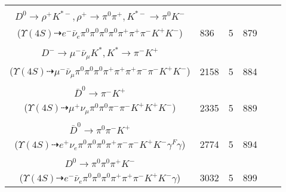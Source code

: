 \documentclass[landscape]{article}
\newcounter{rownumbers}
\newcommand\rn{\stepcounter{rownumbers}\arabic{rownumbers}}
\newcommand{\EOLP}{\\ \hline} %
\newcommand{\topoTags}[1]{#1} %
\begin{document}
\begin{longtable}{clcccc}
\rn & \makecell[l]{ $ 
\Upsilon(4S) \rightarrow B^{+} B^{-} ,
B^{+} \rightarrow \rho^{+} \bar{D}^{0} ,
B^{-} \rightarrow e^{-} \bar{\nu}_{e} D^{*0} ,
\rho^{+} \rightarrow \pi^{0} \pi^{+} ,
\bar{D}^{0} \rightarrow \pi^{-} K^{+} ,
D^{*0} \rightarrow \pi^{0} D^{0} ,
$ \\ $
D^{0} \rightarrow \rho^{+} K^{*-} ,
\rho^{+} \rightarrow \pi^{0} \pi^{+} ,
K^{*-} \rightarrow \pi^{0} K^{-} 
$ \\ ($
\Upsilon(4S) \dashrightarrow e^{-} \bar{\nu}_{e} \pi^{0} \pi^{0} \pi^{0} \pi^{0} \pi^{+} \pi^{+} \pi^{-} K^{+} K^{-} 
$) } & \topoTags{836 & }5 & 879 \EOLP

\rn & \makecell[l]{ $ 
\Upsilon(4S) \rightarrow B^{+} B^{-} ,
B^{+} \rightarrow \pi^{0} \pi^{+} \pi^{+} D^{*-} ,
B^{-} \rightarrow \rho^{-} D^{0} ,
D^{*-} \rightarrow \pi^{0} D^{-} ,
\rho^{-} \rightarrow \pi^{0} \pi^{-} ,
D^{0} \rightarrow \pi^{+} K^{-} ,
$ \\ $
D^{-} \rightarrow \mu^{-} \bar{\nu}_{\mu} K^{*} ,
K^{*} \rightarrow \pi^{-} K^{+} 
$ \\ ($
\Upsilon(4S) \dashrightarrow \mu^{-} \bar{\nu}_{\mu} \pi^{0} \pi^{0} \pi^{0} \pi^{+} \pi^{+} \pi^{+} \pi^{-} \pi^{-} K^{+} K^{-} 
$) } & \topoTags{2158 & }5 & 884 \EOLP

\rn & \makecell[l]{ $ 
\Upsilon(4S) \rightarrow B^{+} B^{-} ,
B^{+} \rightarrow \mu^{+} \nu_{\mu} \bar{D}^{*0} ,
B^{-} \rightarrow \rho^{-} D^{0} ,
\bar{D}^{*0} \rightarrow \pi^{0} \bar{D}^{0} ,
\rho^{-} \rightarrow \pi^{0} \pi^{-} ,
D^{0} \rightarrow K^{+} K^{-} ,
$ \\ $
\bar{D}^{0} \rightarrow \pi^{-} K^{+} 
$ \\ ($
\Upsilon(4S) \dashrightarrow \mu^{+} \nu_{\mu} \pi^{0} \pi^{0} \pi^{-} \pi^{-} K^{+} K^{+} K^{-} 
$) } & \topoTags{2335 & }5 & 889 \EOLP

\rn & \makecell[l]{ $ 
\Upsilon(4S) \rightarrow B^{+} B^{-} ,
B^{+} \rightarrow e^{+} \nu_{e} \bar{D}^{*0} \gamma^{F} ,
B^{-} \rightarrow \rho^{-} D^{0} ,
\bar{D}^{*0} \rightarrow \bar{D}^{0} \gamma ,
\rho^{-} \rightarrow \pi^{0} \pi^{-} ,
D^{0} \rightarrow \pi^{0} \pi^{+} K^{-} ,
$ \\ $
\bar{D}^{0} \rightarrow \pi^{0} \pi^{-} K^{+} 
$ \\ ($
\Upsilon(4S) \dashrightarrow e^{+} \nu_{e} \pi^{0} \pi^{0} \pi^{0} \pi^{+} \pi^{-} \pi^{-} K^{+} K^{-} \gamma^{F} \gamma 
$) } & \topoTags{2774 & }5 & 894 \EOLP

\rn & \makecell[l]{ $ 
\Upsilon(4S) \rightarrow B^{+} B^{-} ,
B^{+} \rightarrow \rho^{+} \bar{D}^{0} ,
B^{-} \rightarrow e^{-} \bar{\nu}_{e} D^{*0} ,
\rho^{+} \rightarrow \pi^{0} \pi^{+} ,
\bar{D}^{0} \rightarrow \pi^{-} K^{+} ,
D^{*0} \rightarrow D^{0} \gamma ,
$ \\ $
D^{0} \rightarrow \pi^{0} \pi^{0} \pi^{+} K^{-} 
$ \\ ($
\Upsilon(4S) \dashrightarrow e^{-} \bar{\nu}_{e} \pi^{0} \pi^{0} \pi^{0} \pi^{+} \pi^{+} \pi^{-} K^{+} K^{-} \gamma 
$) } & \topoTags{3032 & }5 & 899 \EOLP


\end{longtable}
\end{document}

